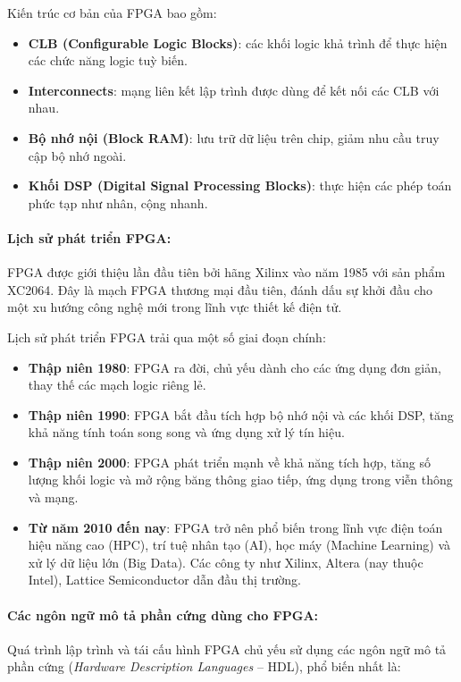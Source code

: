 \documentclass[a4paper]{article}
\begin{document}
Kiến trúc cơ bản của FPGA bao gồm:
\begin{itemize} [label=-]
    \item \textbf{CLB (Configurable Logic Blocks)}: các khối logic khả trình để thực hiện các chức năng logic tuỳ biến.
    \item \textbf{Interconnects}: mạng liên kết lập trình được dùng để kết nối các CLB với nhau.
    \item \textbf{Bộ nhớ nội (Block RAM)}: lưu trữ dữ liệu trên chip, giảm nhu cầu truy cập bộ nhớ ngoài.
    \item \textbf{Khối DSP (Digital Signal Processing Blocks)}: thực hiện các phép toán phức tạp như nhân, cộng nhanh.
\end{itemize}

\paragraph{Lịch sử phát triển FPGA:} FPGA được giới thiệu lần đầu tiên bởi hãng Xilinx vào năm 1985 với sản phẩm XC2064. Đây là mạch FPGA thương mại đầu tiên, đánh dấu sự khởi đầu cho một xu hướng công nghệ mới trong lĩnh vực thiết kế điện tử. 

Lịch sử phát triển FPGA trải qua một số giai đoạn chính:
\begin{itemize} [label=-]
    \item \textbf{Thập niên 1980}: FPGA ra đời, chủ yếu dành cho các ứng dụng đơn giản, thay thế các mạch logic riêng lẻ.
    \item \textbf{Thập niên 1990}: FPGA bắt đầu tích hợp bộ nhớ nội và các khối DSP, tăng khả năng tính toán song song và ứng dụng xử lý tín hiệu.
    \item \textbf{Thập niên 2000}: FPGA phát triển mạnh về khả năng tích hợp, tăng số lượng khối logic và mở rộng băng thông giao tiếp, ứng dụng trong viễn thông và mạng.
    \item \textbf{Từ năm 2010 đến nay}: FPGA trở nên phổ biến trong lĩnh vực điện toán hiệu năng cao (HPC), trí tuệ nhân tạo (AI), học máy (Machine Learning) và xử lý dữ liệu lớn (Big Data). Các công ty như Xilinx, Altera (nay thuộc Intel), Lattice Semiconductor dẫn đầu thị trường.
\end{itemize}

\paragraph{Các ngôn ngữ mô tả phần cứng dùng cho FPGA:}
Quá trình lập trình và tái cấu hình FPGA chủ yếu sử dụng các ngôn ngữ mô tả phần cứng (\textit{Hardware Description Languages} -- HDL), phổ biến nhất là:
\end{document}

